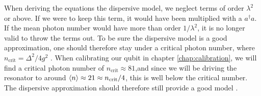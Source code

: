 When deriving the equations the dispersive model, we neglect terms of order $\lambda^2$ or above. If we were to keep this term, it would have been multiplied with a $a^\dagger a$. If the mean photon number would have more than order $1 / \lambda^2$, it is no longer valid to throw the terms out. To be sure the dispersive model is a good approximation, one should therefore stay under a critical photon number, where $n_{\text{crit}} = \Delta^2 / 4 g^2$ \cite{krantz_quantum_2019}.
When calibrating our qubit in chapter \ref{chap:calibration}, we will find a critical photon number of $n_{\text{crit}} \approx 81$,and since we will be driving the resonator to around $\expval{n} \approx 21 \approx n_{\text{crit}} / 4$, this is well below the critical number. The dispersive approximation should therefore still provide a good model \cite{boissonneault_dispersive_2009}. 



